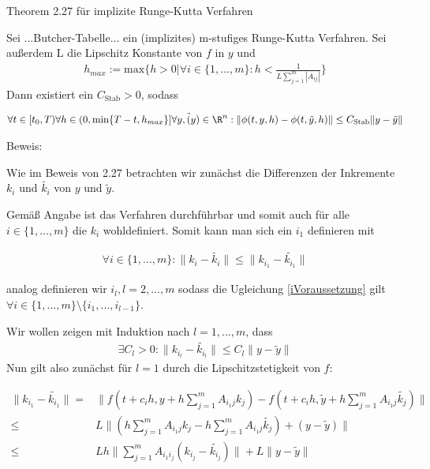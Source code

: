 \begin{solution}
Theorem 2.27 für implizite Runge-Kutta Verfahren

Sei ...Butcher-Tabelle... ein (implizites) m-stufiges Runge-Kutta Verfahren. Sei außerdem L die Lipschitz Konstante von $f$ in $y$ und
\begin{align*}
  h_{max} := \text{max}\{h>0|\forall i \in \{1,...,m\}:h<\frac{1}{L\sum_{j=1}^{m}|A_{ij}|}\}
\end{align*}
Dann existiert ein $C_{\text{Stab}} > 0$, sodass

\begin{align*}
  \forall t \in [t_{0},T) \forall h \in (0,\text{min}\{T-t,h_{max}\}] \forall y, \tilde(y) \in \R^{n} : \|\phi(t,y,h) - \phi(t,\tilde{y},h)\| \leq C_{\text{Stab}} \|y-\tilde{y}\|
\end{align*}

Beweis:

Wie im Beweis von 2.27 betrachten wir zunächst die Differenzen der Inkremente $k_{i}$ und $\tilde{k_{i}}$ von $y$ und $\tilde{y}$.

Gemäß Angabe ist das Verfahren durchführbar und somit auch für alle $i \in \{1,...,m\}$ die $k_{i}$ wohldefiniert.
Somit kann man sich ein $i_{1}$ definieren mit

\begin{align}\label{iVoraussetzung}
  \forall i\in \{1,...,m\}: \|k_{i}-\tilde{k_{i}}\| \leq \|k_{i_{1}}-\tilde{k_{i_{1}}}\|
\end{align}

analog definieren wir $i_{l}, l=2,...,m$ sodass die Ugleichung \eqref{iVoraussetzung} gilt $\forall i\in \{1,...,m\}\setminus \{i_{1},...,i_{l-1}\}$.

Wir wollen zeigen mit Induktion nach $l=1,...,m$, dass
\begin{align}\label{ind}
  \exists C_{l}>0: \|k_{i_{l}}-\tilde{k_{i_{l}}}\| \leq C_{l} \|y-\tilde{y}\|
\end{align}
Nun gilt also zunächst für $l=1$ durch die Lipschitzstetigkeit von $f$:

\begin{align*}
  \|k_{i_{1}}-\tilde{k_{i_{1}}}\| =& \|f(t+c_{i}h,y+h\sum_{j=1}^{m}A_{i_{1}j}k_{j})-f(t+c_{i}h,\tilde{y}+h\sum_{j=1}^{m}A_{i_{1}j}\tilde{k_{j}})\| \\
  \leq& L\|(h\sum_{j=1}^{m}A_{i_{1}j}k_{j}-h\sum_{j=1}^{m}A_{i_{1}j}\tilde{k_{j}}) + (y-\tilde{y})\| \\
  \leq& Lh \|\sum_{j=1}^{m}A_{i_{1}i_{j}}(k_{i_{j}}-\tilde{k_{i_{j}}})\| + L\|y-\tilde{y}\|
\end{align*}


\end{solution}

